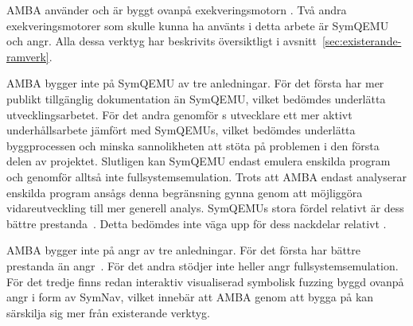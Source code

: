 AMBA använder och är byggt ovanpå exekveringsmotorn \stoe{}. Två andra
exekveringsmotorer som skulle kunna ha använts i detta arbete är SymQEMU och
angr. Alla dessa verktyg har beskrivits översiktligt i
avsnitt~\ref{sec:existerande-ramverk}.

AMBA bygger inte på SymQEMU av tre anledningar. För det första har \stoe{} mer
publikt tillgänglig dokumentation än SymQEMU, vilket bedömdes underlätta
utvecklingsarbetet. För det andra genomför \stoe{}s utvecklare ett mer aktivt
underhållsarbete jämfört med SymQEMUs, vilket bedömdes underlätta byggprocessen
och minska sannolikheten att stöta på problemen i den första delen av projektet.
Slutligen kan SymQEMU endast emulera enskilda program och genomför alltså inte
fullsystemsemulation. Trots att AMBA endast analyserar enskilda program ansågs
denna begränsning gynna \stoe{} genom att möjliggöra vidareutveckling till mer
generell analys. SymQEMUs stora fördel relativt \stoe{} är dess bättre
prestanda~\cite{systematic_comparison_symbex}.  Detta bedömdes inte väga upp för
dess nackdelar relativt \stoe{}.

AMBA bygger inte på angr av tre anledningar. För det första har \stoe{} bättre
prestanda än angr~\cite{systematic_comparison_symbex}. För det andra stödjer
inte heller angr fullsystemsemulation. För det tredje finns redan interaktiv
visualiserad symbolisk fuzzing byggd ovanpå angr i form av SymNav, vilket
innebär att AMBA genom att bygga på \stoe{} kan särskilja sig mer från
existerande verktyg.
